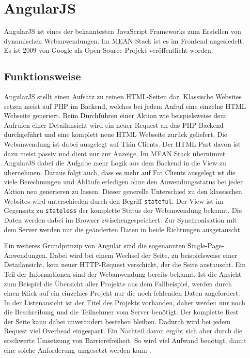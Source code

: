 \chapter{AngularJS}
\label{angularjs}

AngularJS ist eines der bekanntesten JavaScript Frameworks zum Erstellen von dynamischen Webanwendungen. Im MEAN Stack ist es im Frontend angesiedelt. Es ist 2009 von Google als Open Source Projekt veröffentlicht worden. 

\section{Funktionsweise}
AngularJS stellt einen Aufsatz zu reinen HTML-Seiten dar. 
Klassische Websites setzen meist auf PHP im Backend, welches bei jedem Aufruf eine einzelne HTML Webseite generiert.
Beim Durchführen einer Aktion wie beispielsweise dem Aufrufen einer Detailansicht wird ein neuer Request an das PHP Backend durchgeführt und eine komplett neue HTML Webseite zurück geliefert.
Die Webanwendung ist dabei ausgelegt auf Thin Clients.
Der HTML Part davon ist dazu meist passiv und dient nur zur Anzeige.
Im MEAN Stack übernimmt AngularJS dabei die Aufgabe mehr Logik aus dem Backend in die View zu übernehmen.
Daraus folgt auch, dass es mehr auf Fat Clients ausgelegt ist die viele Berechnungen und Abläufe erledigen ohne den Anwendungsstatus bei jeder Aktion neu generieren zu lassen.
Dieser generelle Unterschied zu den klassischen Websites wird unterschieden durch den Begriff \texttt{stateful}.
Der View ist im Gegensatz zu \texttt{stateless} der komplette Status der Webanwendung bekannt.
Die Daten werden dabei im Browser zwischengespeichert.
Zur Synchronisation mit dem Server werden nur die geänderten Daten in beide Richtungen ausgetauscht.

Ein weiteres Grundprinzip von Angular sind die sogenannten Single-Page-Anwendungen.
Dabei wird bei einem Wechsel der Seite, zu beispielsweise einer Detailansicht, kein neuer HTTP-Request verschickt, der die Seite austauscht.
Ein Teil der Informationen sind der Webanwendung bereits bekannt.
Ist die Ansicht zum Beispiel die Übersicht aller Projekte aus dem Fallbeispiel, werden durch einen Klick auf ein einzelnes Projekt nur die noch fehlenden Daten angefordert.
In der Listenansicht ist der Titel des Projekts vorhanden, daher werden nur noch die Beschreibung und die Teilnehmer vom Server benötigt.
Der komplette Rest der Seite kann dabei unverändert bestehen bleiben.
Dadurch wird bei jedem Request viel Overhead eingespart.
Ein Nachteil davon ergibt sich aber durch die erschwerte Umsetzung von Barrierefreiheit.
So wird viel Aufwand benötigt, damit eine solche Anforderung umgesetzt werden kann \cite{thoughtworks:disabilities}.

